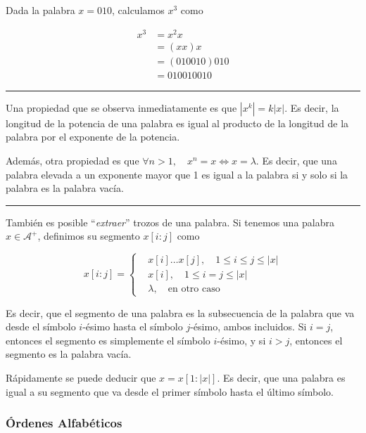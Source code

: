 Dada la palabra \(x=010\), calculamos \(x^3\) como


\begin{align*}
x^3&=x^2x\\
&=(xx)x\\
&=(010010)010\\
&=010010010
\end{align*}


\begin{center}\rule{0.5\linewidth}{0.5pt}\end{center}

Una propiedad que se observa inmediatamente es que
\(\left|x^k\right|=k\left|x\right|\). Es decir, la longitud de la
potencia de una palabra es igual al producto de la longitud de la
palabra por el exponente de la potencia.

Además, otra propiedad es que
\(\forall n>1,\quad x^n = x \Leftrightarrow x = \lambda\). Es decir, que
una palabra elevada a un exponente mayor que 1 es igual a la palabra si
y solo si la palabra es la palabra vacía.

\begin{center}\rule{0.5\linewidth}{0.5pt}\end{center}

También es posible ``\emph{extraer}'' trozos de una palabra. Si tenemos
una palabra \(x\in\mathcal{A}^+\), definimos su segmento \(x[i:j]\) como

\[
x[i:j] =\begin{cases}
& x[i]\dots x[j],\quad 1\leq i\leq j\leq|x|\\
& x[i],\quad 1\leq i = j\leq |x|\\
& \lambda,\quad\text{en otro caso}
\end{cases}
\]

Es decir, que el segmento de una palabra es la subsecuencia de la
palabra que va desde el símbolo \(i\)-ésimo hasta el símbolo
\(j\)-ésimo, ambos incluidos. Si \(i=j\), entonces el segmento es
simplemente el símbolo \(i\)-ésimo, y si \(i>j\), entonces el segmento
es la palabra vacía.

Rápidamente se puede deducir que \(x = x[1:|x|]\). Es decir, que una
palabra es igual a su segmento que va desde el primer símbolo hasta el
último símbolo.

\subsubsection{Órdenes Alfabéticos}\label{uxf3rdenes-alfabuxe9ticos}

